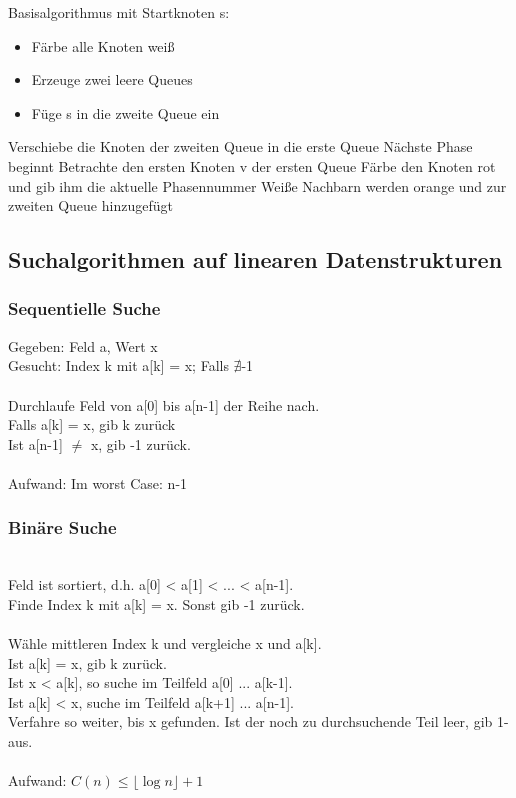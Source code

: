 \documentclass[fleqn]{scrartcl}
\begin{document}
Basisalgorithmus mit Startknoten s:
\begin{itemize}
\item Färbe alle Knoten weiß
\item Erzeuge zwei leere Queues
\item Füge s in die zweite Queue ein
\end{itemize}
\begin{algorithmic}
\State Verschiebe die Knoten der zweiten Queue in die erste Queue
\State Nächste Phase beginnt
\State Betrachte den ersten Knoten v der ersten Queue
\State Färbe den Knoten rot und gib ihm die aktuelle Phasennummer
\State Weiße Nachbarn werden orange und zur zweiten Queue hinzugefügt
\EndWhile
\EndWhile
\end{algorithmic}

\subsection{Suchalgorithmen auf linearen Datenstrukturen}
\subsubsection{Sequentielle Suche}
Gegeben: Feld a, Wert x\\
Gesucht: Index k mit a[k] = x; Falls $\nexists$-1\\\\
Durchlaufe Feld von a[0] bis a[n-1] der Reihe nach.\\
Falls a[k] = x, gib k zurück\\
Ist a[n-1] $\neq$ x, gib -1 zurück.\\
\\
Aufwand: Im worst Case: n-1
\subsubsection{Binäre Suche} $ $\\
Feld ist sortiert, d.h. a[0] < a[1] < ... < a[n-1].\\
Finde Index k mit a[k] = x. Sonst gib -1 zurück.\\
\\
Wähle mittleren Index k und vergleiche x und a[k].\\
Ist a[k] = x, gib k zurück.\\
Ist x < a[k], so suche im Teilfeld a[0] ... a[k-1].\\
Ist a[k] < x, suche im Teilfeld a[k+1] ... a[n-1].\\
Verfahre so weiter, bis x gefunden. Ist der noch zu durchsuchende Teil leer, gib 1- aus.\\
\\
Aufwand: $C(n) \leq \lfloor \log n \rfloor +1$
\end{document}
